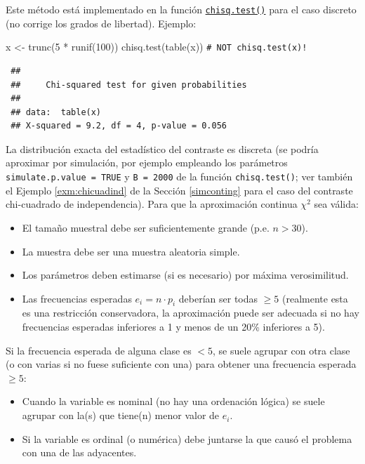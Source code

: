 \documentclass[
  10pt,
]{book}
\newenvironment{Shaded}{\begin{snugshade}}{\end{snugshade}}
\newcommand{\CommentTok}[1]{\textcolor[rgb]{0.56,0.35,0.01}{\textit{#1}}}
\newcommand{\DecValTok}[1]{\textcolor[rgb]{0.00,0.00,0.81}{#1}}
\newcommand{\FunctionTok}[1]{\textcolor[rgb]{0.00,0.00,0.00}{#1}}
\newcommand{\NormalTok}[1]{#1}
\newcommand{\OtherTok}[1]{\textcolor[rgb]{0.56,0.35,0.01}{#1}}
\newcommand{\SpecialCharTok}[1]{\textcolor[rgb]{0.00,0.00,0.00}{#1}}
\theoremstyle{break}
\theoremstyle{nonumberplain}
\renewcommand{\CommentTok}[1]{\textcolor[rgb]{0.41,0.41,0.41}{\texttt{#1}}}
\begin{document}
Este método está implementado en la función \href{https://rdrr.io/r/stats/chisq.test.html}{\texttt{chisq.test()}} para el caso discreto (no corrige los grados de libertad).
Ejemplo:

\begin{Shaded}
\begin{Highlighting}[]
\NormalTok{x }\OtherTok{\textless{}{-}} \FunctionTok{trunc}\NormalTok{(}\DecValTok{5} \SpecialCharTok{*} \FunctionTok{runif}\NormalTok{(}\DecValTok{100}\NormalTok{))}
\FunctionTok{chisq.test}\NormalTok{(}\FunctionTok{table}\NormalTok{(x))            }\CommentTok{\# NOT \textquotesingle{}chisq.test(x)\textquotesingle{}!}
\end{Highlighting}
\end{Shaded}

\begin{verbatim}
 ## 
 ##     Chi-squared test for given probabilities
 ## 
 ## data:  table(x)
 ## X-squared = 9.2, df = 4, p-value = 0.056
\end{verbatim}

La distribución exacta del estadístico del contraste es discreta (se podría aproximar por simulación, por ejemplo empleando los parámetros \texttt{simulate.p.value\ =\ TRUE} y \texttt{B\ =\ 2000} de la función \texttt{chisq.test()}; ver también el Ejemplo \ref{exm:chicuadind} de la Sección \ref{simconting} para el caso del contraste chi-cuadrado de independencia).
Para que la aproximación continua \(\chi^2\) sea válida:

\begin{itemize}
\item
  El tamaño muestral debe ser suficientemente grande (p.e. \(n>30\)).
\item
  La muestra debe ser una muestra aleatoria simple.
\item
  Los parámetros deben estimarse (si es necesario) por máxima
  verosimilitud.
\item
  Las frecuencias esperadas \(e_{i}=n\cdot p_{i}\) deberían ser todas
  \(\geq5\) (realmente esta es una restricción conservadora, la aproximación
  puede ser adecuada si no hay frecuencias esperadas inferiores a 1 y
  menos de un 20\% inferiores a 5).
\end{itemize}

Si la frecuencia esperada de alguna clase es \(<5\), se suele agrupar con otra
clase (o con varias si no fuese suficiente con una) para obtener una
frecuencia esperada \(\geq5\):

\begin{itemize}
\item
  Cuando la variable es nominal (no hay una ordenación lógica) se
  suele agrupar con la(s) que tiene(n) menor valor de \(e_{i}\).
\item
  Si la variable es ordinal (o numérica) debe juntarse la que causó el
  problema con una de las adyacentes.
\end{itemize}
\end{document}
